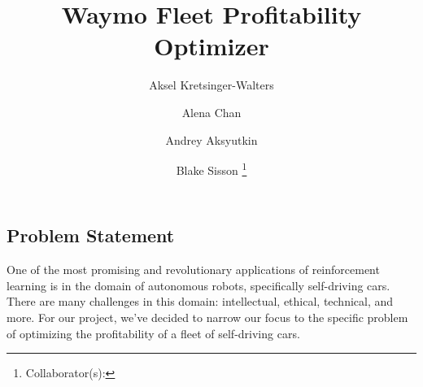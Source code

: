 \documentclass[12pt]{article}
\title{Waymo Fleet Profitability Optimizer}
\author{
		Aksel Kretsinger-Walters \and
		Alena Chan \and
		Andrey Aksyutkin \and
		Blake Sisson \footnote{Collaborator(s): \collaborators}
}
\date{}
\begin{document}
\maketitle

\subsection*{Problem Statement}
One of the most promising and revolutionary applications of reinforcement learning is in
the domain of autonomous robots,
specifically self-driving cars. There are many challenges in this domain: intellectual,
ethical, technical, and more.
For our project, we've decided to narrow our focus to the specific problem of optimizing
the profitability of a fleet of
self-driving cars.
\end{document}
